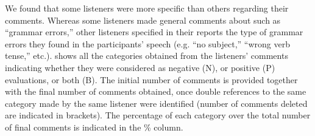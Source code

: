 \documentclass[output=paper]{langsci/langscibook}
\begin{document}
We found that some listeners were more specific than others regarding their comments. Whereas some listeners made general comments about  such as “grammar errors,” other listeners specified in their reports the type of grammar errors they found in the participants’ speech (e.g. “no subject,” “wrong verb tense,” etc.).  shows all the categories obtained from the listeners’ comments indicating whether they were considered as negative (N), or positive (P) evaluations, or both (B). The initial number of comments is provided together with the final number of comments obtained, once double references to the same category made by the same listener were identified (number of comments deleted are indicated in brackets). The percentage of each category over the total number of final comments is indicated in the \% column.
\end{document}
